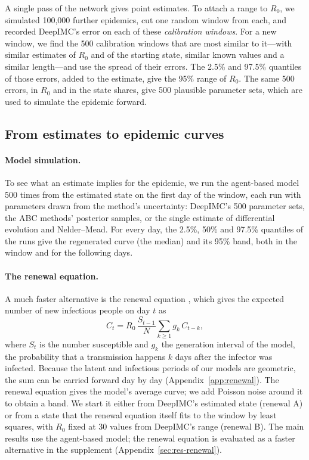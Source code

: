 \documentclass[12pt]{article}
\begin{document}
A single pass of the network gives point estimates. To attach a range to $R_0$, we simulated 100,000
further epidemics, cut one random window from each, and recorded DeepIMC's error on each of these
\emph{calibration windows}. For a new window, we find the 500 calibration windows that are most
similar to it---with similar estimates of $R_0$ and of the starting state, similar known values and a
similar length---and use the spread of their errors. The 2.5\% and 97.5\% quantiles of those errors,
added to the estimate, give the 95\% range of $R_0$. The same 500 errors, in $R_0$ and in the state
shares, give 500 plausible parameter sets, which are used to simulate the epidemic forward.

\subsection{From estimates to epidemic curves}\label{sec:prediction}

\paragraph{Model simulation.} To see what an estimate implies for the epidemic, we run the agent-based
model 500 times from the estimated state on the first day of the window, each run with parameters drawn
from the method's uncertainty: DeepIMC's 500 parameter sets, the ABC methods' posterior samples, or
the single estimate of differential evolution and Nelder--Mead. For every day, the 2.5\%, 50\% and
97.5\% quantiles of the runs give the regenerated curve (the median) and its 95\% band, both in the
window and for the following days.

\paragraph{The renewal equation.} A much faster alternative is the renewal equation
\autocite{fraser2007estimating,wallinga2007generation}, which gives the expected number of new
infectious people on day $t$ as
\begin{equation}\label{eq:renewal}
C_t = R_0\,\frac{S_{t-1}}{N}\sum_{k\ge 1} g_k\, C_{t-k},
\end{equation}
where $S_t$ is the number susceptible and $g_k$ the generation interval of the model, the probability
that a transmission happens $k$ days after the infector was infected. Because the latent and
infectious periods of our models are geometric, the sum can be carried forward day by day
(Appendix~\ref{app:renewal}). The renewal equation gives the model's average curve; we add Poisson
noise around it to obtain a band. We start it either from DeepIMC's estimated state (renewal A) or
from a state that the renewal equation itself fits to the window by least squares, with $R_0$ fixed
at 30 values from DeepIMC's range (renewal B). The main results use the agent-based model; the renewal equation is
evaluated as a faster alternative in the supplement (Appendix~\ref{sec:res-renewal}).
\end{document}
